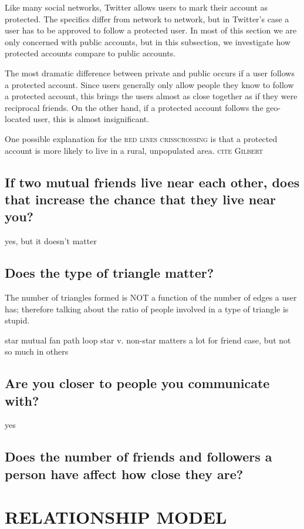 \documentclass{sig-alternate}
\begin{document}
Like many social networks, Twitter allows users to mark their account as protected. The specifics differ from network to network, but in Twitter's case a user has to be approved to follow a protected user.
In most of this section we are only concerned with public accounts, but in this subsection, we investigate how protected accounts compare to public accounts.

The most dramatic difference between private and public occurs if a user follows a protected account.
Since users generally only allow people they know to follow a protected account, this brings the users almost as close together as if they were reciprocal friends. On the other hand, if a protected account follows the geo-located user, this is almost insignificant.

One possible explanation for the \textsc{red lines crisscrossing} is that a protected account is more likely to live in a rural, unpopulated area. \textsc{cite Gilbert}

\subsection{If two mutual friends live near each other, does that increase the chance that they live near you?}
yes, but it doesn't matter

\subsection{Does the type of triangle matter?}

The number of triangles formed is NOT a function of the number of edges a user has; therefore talking about the ratio of people involved in a type of triangle is stupid.

star
mutual fan
path
loop 
star v. non-star matters a lot for friend case, but not so much in others



\subsection{Are you closer to people you communicate with?}
yes

\subsection{Does the number of friends and followers a person have affect how close they are?}


\section{RELATIONSHIP MODEL}
\label{sec:model}
\end{document}
